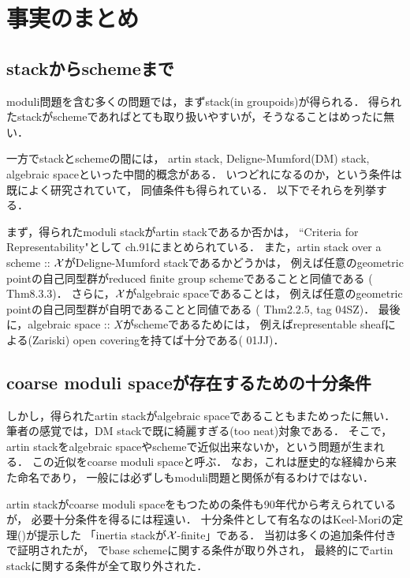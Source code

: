 \section{事実のまとめ}
    \subsection{stackからschemeまで}
    moduli問題を含む多くの問題では，まずstack(in groupoids)が得られる．
    得られたstackがschemeであればとても取り扱いやすいが，そうなることはめったに無い．
    
    一方でstackとschemeの間には，
    artin stack, Deligne-Mumford(DM) stack, algebraic spaceといった中間的概念がある．
    いつどれになるのか，という条件は既によく研究されていて，
    同値条件も得られている．
    以下でそれらを列挙する．

    まず，得られたmoduli stackがartin stackであるか否かは，
    ``Criteria for Representability"として\cite{SP} ch.91にまとめられている．
    また，artin stack over a scheme :: $\mathcal{X}$がDeligne-Mumford stackであるかどうかは，
    例えば任意のgeometric pointの自己同型群がreduced finite group schemeであることと同値である
    (\cite{ASS} Thm8.3.3)．
    さらに，$\mathcal{X}$がalgebraic spaceであることは，
    例えば任意のgeometric pointの自己同型群が自明であることと同値である
    (\cite{Con07} Thm2.2.5, \cite{SP} tag 04SZ)．
    最後に，algebraic space :: $X$がschemeであるためには，
    例えばrepresentable sheafによる(Zariski) open coveringを持てば十分である(\cite{SP} 01JJ)．

    \subsection{coarse moduli spaceが存在するための十分条件}
    しかし，得られたartin stackがalgebraic spaceであることもまためったに無い．
    筆者の感覚では，DM stackで既に綺麗すぎる(too neat)対象である．
    そこで，artin stackをalgebraic spaceやschemeで近似出来ないか，という問題が生まれる．
    この近似をcoarse moduli spaceと呼ぶ．
    なお，これは歴史的な経緯から来た命名であり，
    一般には必ずしもmoduli問題と関係が有るわけではない．

    artin stackがcoarse moduli spaceをもつための条件も90年代から考えられているが，
    必要十分条件を得るには程遠い．
    十分条件として有名なのはKeel-Moriの定理(\cite{KM97})が提示した
    「inertia stackが$\mathcal{X}$-finite」である．
    当初は多くの追加条件付きで証明されたが，
    \cite{Con05}でbase schemeに関する条件が取り外され，
    最終的に\cite{Rydh13}でartin stackに関する条件が全て取り外された．
    
